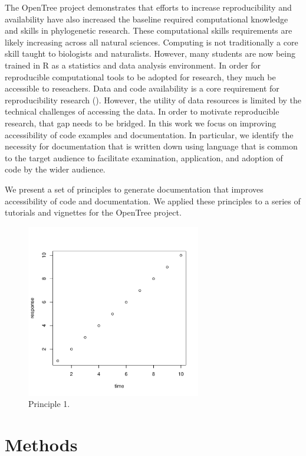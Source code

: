 \documentclass[12pt]{article}
\begin{document}
The OpenTree project demonstrates that efforts to increase reproducibility and availability have also increased the baseline required computational knowledge and skills in phylogenetic research.
These computational skills requirements are likely increasing across all natural sciences.
Computing is not traditionally a core skill taught to biologists and naturalists.
However, many students are now being trained in R as a statistics and data analysis environment.
In order for reproducible computational tools to be adopted for research, they much be accessible to reseachers.
Data and code availability is a core requirement for reproducibility research (\cite{peng2011reproducible, sandve2013ten, powers2019open}).
However, the utility of data resources is limited by the technical challenges of accessing the data.
In order to motivate reproducible research, that gap needs to be bridged.
In this work we focus on improving accessibility of code examples and documentation.
In particular, we identify the necessity for documentation that is written down using language that is common to the target audience to facilitate examination, application, and adoption of code by the wider audience.

We present a set of principles to generate documentation that improves accessibility of code and documentation. We applied these principles to a series of tutorials and vignettes for the OpenTree project.

\begin{figure}
\begin{center}
\includegraphics[width=3in]{fig1.pdf}
\end{center}
\caption{Principle 1. \label{fig:first}}
\end{figure}



\section{Methods}
\label{sec:meth}
\end{document}
